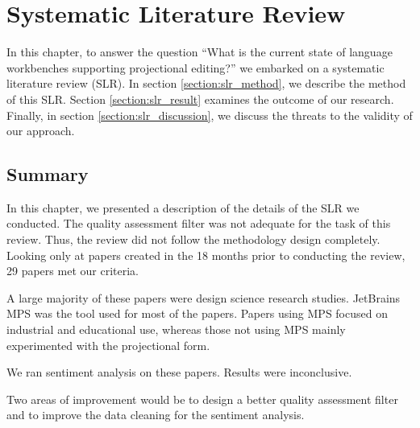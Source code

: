 \chapter{Systematic Literature Review}
\label{chapter:SLR}

In this chapter, to answer the question ``What is the current state of language workbenches supporting projectional editing?'' we embarked on a systematic literature review (SLR).
In section \ref{section:slr_method}, we describe the method of this SLR.
Section \ref{section:slr_result} examines the outcome of our research.
Finally, in section \ref{section:slr_discussion}, we discuss the threats to the validity of our approach. 








\section{Summary}
In this chapter, we presented a description of the details of the SLR we conducted.
The quality assessment filter was not adequate for the task of this review. 
Thus, the review did not follow the methodology design completely.
Looking only at papers created in the 18 months prior to conducting the review, 29 papers met our criteria.

A large majority of these papers were design science research studies.
JetBrains MPS was the tool used for most of the papers.
Papers using MPS focused on industrial and educational use, whereas those not using MPS mainly experimented with the projectional form.

We ran sentiment analysis on these papers. 
Results were inconclusive.

Two areas of improvement would be to design a better quality assessment filter and to improve the data cleaning for the sentiment analysis.